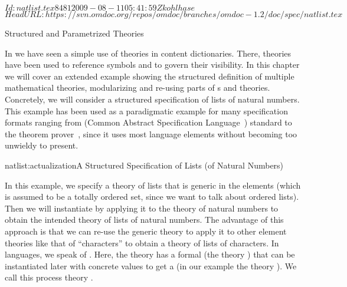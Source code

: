 \svnInfo $Id: natlist.tex 8481 2009-08-11 05:41:59Z kohlhase $
\svnKeyword $HeadURL: https://svn.omdoc.org/repos/omdoc/branches/omdoc-1.2/doc/spec/natlist.tex $

\begin{tchapter}[id=natlist]{Structured and Parametrized Theories}
  
In {} we have seen a simple use of theories in {\openmath} content
dictionaries. There, theories have been used to reference {\openmath} symbols and to
govern their visibility. In this chapter we will cover an extended example showing the
structured definition of multiple mathematical theories, modularizing and re-using parts
of {s} and theories.  Concretely, we will consider a
structured specification of lists of natural numbers. This example has been used as a
paradigmatic example for many specification formats ranging from {\casl} (Common Abstract
Specification Language~\cite{CoFI:2004:CASL-RM}) standard to the {\pvs} theorem prover~\cite{OwRu92},
since it uses most language elements without becoming too unwieldy to present.

\begin{myfig}{natlist:actualization}{A Structured Specification of Lists (of
    Natural Numbers)}
  \begin{tikzpicture}\end{tikzpicture}
\end{myfig}

In this example, we specify a theory {} of lists that is generic in the
elements (which is assumed to be a totally ordered set, since we want to talk about
ordered lists).  Then we will instantiate {} by applying it to the theory
{} of natural numbers to obtain the intended theory {} of
lists of natural numbers.  The advantage of this approach is that we can re-use the
generic theory {} to apply it to other element theories like that of
``characters'' to obtain a theory of lists of characters.  In
{} languages, we speak of {}.  Here, the theory {} has a formal
{} (the theory {}) that can be instantiated later with
concrete values to get a {} (in our example the theory
{}).  We call this process theory {}.


\end{tchapter}

